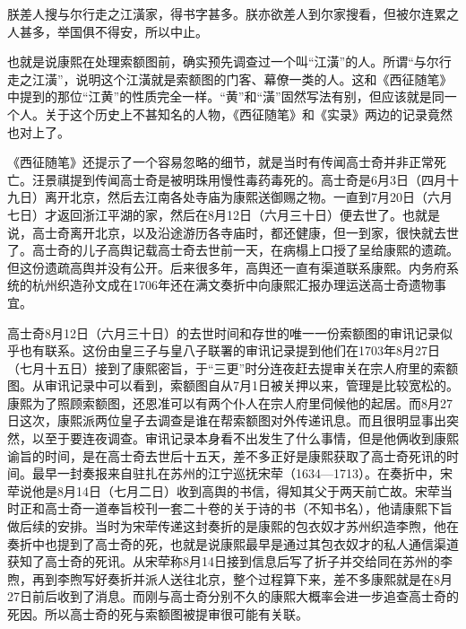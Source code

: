\begin{bookquote}朕差人搜与尔行走之江潢家，得书字甚多。朕亦欲差人到尔家搜看，但被尔连累之人甚多，举国俱不得安，所以中止。\end{bookquote}


也就是说康熙在处理索额图前，确实预先调查过一个叫“江潢”的人。所谓“与尔行走之江潢”，说明这个江潢就是索额图的门客、幕僚一类的人。这和《西征随笔》中提到的那位“江黄”的性质完全一样。“黄”和“潢”固然写法有别，但应该就是同一个人。关于这个历史上不甚知名的人物，《西征随笔》和《实录》两边的记录竟然也对上了。



《西征随笔》还提示了一个容易忽略的细节，就是当时有传闻高士奇并非正常死亡。汪景祺提到传闻高士奇是被明珠用慢性毒药毒死的。高士奇是6月3日（四月十九日）离开北京，然后去江南各处寺庙为康熙送御赐之物。一直到7月20日（六月七日）才返回浙江平湖的家，然后在8月12日（六月三十日）便去世了。也就是说，高士奇离开北京，以及沿途游历各寺庙时，都还健康，但一到家，很快就去世了。高士奇的儿子高舆记载高士奇去世前一天，在病榻上口授了呈给康熙的遗疏。但这份遗疏高舆并没有公开。后来很多年，高舆还一直有渠道联系康熙。内务府系统的杭州织造孙文成在1706年还在满文奏折中向康熙汇报办理运送高士奇遗物事宜。



高士奇8月12日（六月三十日）的去世时间和存世的唯一一份索额图的审讯记录似乎也有联系。这份由皇三子与皇八子联署的审讯记录提到他们在1703年8月27日（七月十五日）接到了康熙密旨，于“三更”时分连夜赶去提审关在宗人府里的索额图。从审讯记录中可以看到，索额图自从7月1日被关押以来，管理是比较宽松的。康熙为了照顾索额图，还恩准可以有两个仆人在宗人府里伺候他的起居。而8月27日这次，康熙派两位皇子去调查是谁在帮索额图对外传递讯息。而且很明显事出突然，以至于要连夜调查。审讯记录本身看不出发生了什么事情，但是他俩收到康熙谕旨的时间，是在高士奇去世后十五天，差不多正好是康熙获取了高士奇死讯的时间。最早一封奏报来自驻扎在苏州的江宁巡抚宋荦（1634—1713）。在奏折中，宋荦说他是8月14日（七月二日）收到高舆的书信，得知其父于两天前亡故。宋荦当时正和高士奇一道奉旨校刊一套二十卷的关于诗的书（不知书名），他请康熙下旨做后续的安排。当时为宋荦传递这封奏折的是康熙的包衣奴才苏州织造李煦，他在奏折中也提到了高士奇的死，也就是说康熙最早是通过其包衣奴才的私人通信渠道获知了高士奇的死讯。从宋荦称8月14日接到信息后写了折子并交给同在苏州的李煦，再到李煦写好奏折并派人送往北京，整个过程算下来，差不多康熙就是在8月27日前后收到了消息。而刚与高士奇分别不久的康熙大概率会进一步追查高士奇的死因。所以高士奇的死与索额图被提审很可能有关联。


